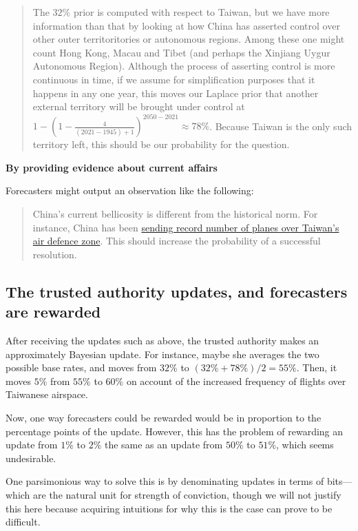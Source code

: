 \documentclass[]{article}
\begin{document}
\begin{quote}
The \(32\%\) prior is computed with respect to Taiwan, but we have more
information than that by looking at how China has asserted control over
other outer territoritories or autonomous regions. Among these one might
count Hong Kong, Macau and Tibet (and perhaps the Xinjiang Uygur
Autonomous Region). Although the process of asserting control is more
continuous in time, if we assume for simplification purposes that it
happens in any one year, this moves our Laplace prior that another
external territory will be brought under control at
\(1-(1-\frac{4}{(2021-1945)+1})^{2050-2021} \approx 78\%\). Because
Taiwan is the only such territory left, this should be our probability
for the question.
\end{quote}

\textbf{By providing evidence about current affairs}

Forecasters might output an observation like the following:

\begin{quote}
China's current bellicosity is different from the historical norm. For
instance, China has been
\href{https://www.bbc.co.uk/news/world-asia-58794094}{sending record
number of planes over Taiwan's air defence zone}. This should increase
the probability of a successful resolution.
\end{quote}

\hypertarget{the-trusted-authority-updates-and-forecasters-are-rewarded}{%
\subsection{The trusted authority updates, and forecasters are
rewarded}\label{the-trusted-authority-updates-and-forecasters-are-rewarded}}

After receiving the updates such as above, the trusted authority makes
an approximately Bayesian update. For instance, maybe she averages the
two possible base rates, and moves from \(32\%\) to
\((32\% + 78\%)/2 = 55\%\). Then, it moves \(5\%\) from \(55\%\) to
\(60\%\) on account of the increased frequency of flights over Taiwanese
airspace.

Now, one way forecasters could be rewarded would be in proportion to the
percentage points of the update. However, this has the problem of
rewarding an update from \(1\%\) to \(2\%\) the same as an update from
\(50\%\) to \(51\%\), which seems undesirable.

One parsimonious way to solve this is by denominating updates in terms
of bits---which are the natural unit for strength of conviction, though
we will not justify this here because acquiring intuitions for why this
is the case can prove to be difficult.
\end{document}
